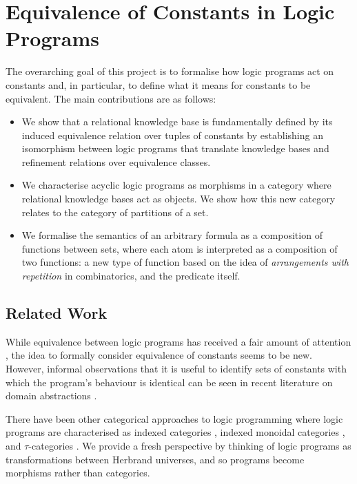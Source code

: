 \documentclass{article}
\begin{document}
\section{Equivalence of Constants in Logic Programs} \label{sec:1}

The overarching goal of this project is to formalise how logic programs act on
constants and, in particular, to define what it means for constants to be
equivalent. The main contributions are as follows:
\begin{itemize}
\item We show that a relational knowledge base is fundamentally defined by its
  induced equivalence relation over tuples of constants by establishing an
  isomorphism between logic programs that translate knowledge bases and
  refinement relations over equivalence classes.
\item We characterise acyclic logic programs as morphisms in a category where
  relational knowledge bases act as objects. We show how this new category
  relates to the category of partitions of a set.
\item We formalise the semantics of an arbitrary formula as a composition of
  functions between sets, where each atom is interpreted as a composition of two
  functions: a new type of function based on the idea of \emph{arrangements with
    repetition} in combinatorics, and the predicate itself.
\end{itemize}

\subsection{Related Work}

While equivalence between logic programs has received a fair amount of attention
\cite{DBLP:journals/tocl/LifschitzPV01,DBLP:conf/ecai/OikarinenJ06,DBLP:conf/iclp/EiterF03},
the idea to formally consider equivalence of constants seems to be new. However,
informal observations that it is useful to identify sets of constants with which
the program's behaviour is identical can be seen in recent literature on domain
abstractions \cite{DBLP:conf/uai/HoltzenMB17}.

There have been other categorical approaches to logic programming where logic
programs are characterised as indexed categories
\cite{DBLP:conf/elp/KinoshitaP96}, indexed monoidal categories
\cite{corradini1992categorical}, and $\tau$-categories
\cite{DBLP:conf/csl/FinkelsteinFL94}. We provide a fresh perspective by thinking
of logic programs as transformations between Herbrand universes, and so programs
become morphisms rather than categories.
\end{document}

